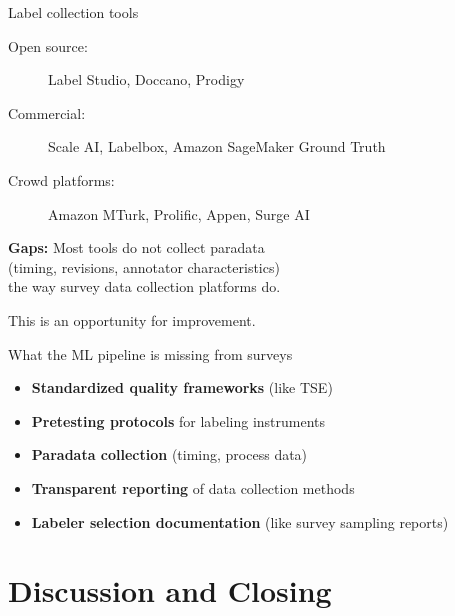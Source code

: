 \documentclass[aspectratio=169,11pt]{beamer}
\begin{document}
\begin{frame}{Label collection tools}

\begin{description}
  \item[Open source:] Label Studio, Doccano, Prodigy
  \item[Commercial:] Scale AI, Labelbox, Amazon SageMaker Ground Truth
  \item[Crowd platforms:] Amazon MTurk, Prolific, Appen, Surge AI
\end{description}

\vspace{1em}

\textbf{Gaps:} Most tools do not collect paradata\\
(timing, revisions, annotator characteristics)\\
the way survey data collection platforms do.

\vspace{1em}

This is an opportunity for improvement.
\end{frame}

\begin{frame}{What the ML pipeline is missing from surveys}

\begin{itemize}
  \item \textbf{Standardized quality frameworks} (like TSE)
  \item \textbf{Pretesting protocols} for labeling instruments
  \item \textbf{Paradata collection} (timing, process data)
  \item \textbf{Transparent reporting} of data collection methods
  \item \textbf{Labeler selection documentation} (like survey sampling reports)
\end{itemize}

\vspace{1em}

\hfill \citep{eckman2024position}
\end{frame}


\section{Discussion and Closing}
\end{document}

